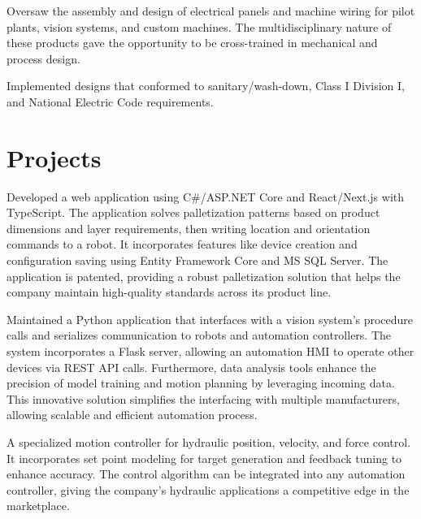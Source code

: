 \documentclass[]{TTurner}
\begin{document}
\begin{minipage}[t]{0.7\textwidth}
\begin{tightemize}
\sectionsep
\item Oversaw the assembly and design of electrical panels and machine wiring for pilot plants, vision systems, and custom machines. The multidisciplinary nature of these products gave the opportunity to be cross-trained in mechanical and process design. 
\item Implemented designs that conformed to sanitary/wash-down, Class I Division I, and National Electric Code requirements.              
\end{tightemize}
\sectionsep

\section{Projects}

\begin{tightemize}
\item Developed a web application using C\#/ASP.NET Core and React/Next.js with TypeScript. The application solves palletization patterns based on product dimensions and layer requirements, then writing location and orientation commands to a robot. It incorporates features like device creation and configuration saving using Entity Framework Core and MS SQL Server. The application is patented, providing a robust palletization solution that helps the company maintain high-quality standards across its product line.
\end{tightemize}
\sectionsep

\begin{tightemize}
\item Maintained a Python application that interfaces with a vision system's procedure calls and serializes communication to robots and automation controllers. The system incorporates a Flask server, allowing an automation HMI to operate other devices via REST API calls. Furthermore, data analysis tools enhance the precision of model training and motion planning by leveraging incoming data. This innovative solution simplifies the interfacing with multiple manufacturers, allowing scalable and efficient automation process.
\end{tightemize}
\sectionsep

\begin{tightemize}
\item A specialized motion controller for hydraulic position, velocity, and force control. It incorporates set point modeling for target generation and feedback tuning to enhance accuracy. The control algorithm can be integrated into any automation controller, giving the company's hydraulic applications a competitive edge in the marketplace. 
\end{tightemize}
\sectionsep


\end{minipage} 
\end{document}
